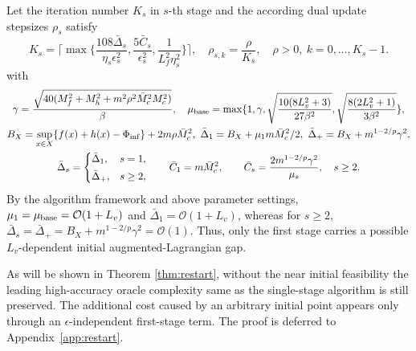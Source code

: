 \documentclass[11pt]{article}
\numberwithin{equation}{section}
\newcommand{\be}{\begin{equation}}
\newcommand{\ee}{\end{equation}}
\begin{document}
Let the iteration number $K_s$ in $s$-th stage and the according dual update stepsizes $\rho_s$ satisfy
\be\label{K-s}
K_s=\lceil\max\{\frac{108\bar\Delta_s}{\eta_s\epsilon_s^2},
\frac{5\bar C_s}{\epsilon_s^2},
\frac{1}{L_f^2\eta_s^2}\}\rceil,
\quad \rho_{s,k}=\frac{\rho}{K_s},\quad \rho>0,\ k=0,\ldots,K_s-1.
\ee
with
\be\label{par-set-s}
\begin{gathered}
\gamma=\frac{\sqrt{40(M_f^2+M_h^2+m^2\rho^2\bar{M}_c^2M_c^2)}}{\beta},\quad \mu_{\rm base}=\max\{1,\gamma,
\sqrt{\frac{10(8L_v^2+3)}{27\beta^2}},
\sqrt{\frac{8(2L_v^2+1)}{3\beta^2}}\},\\
B_X=\sup_{x\in X}\{f(x)+h(x)-\Phi_{\rm inf}\}+2m\rho \bar{M}_c^2,\ 
 \bar\Delta_1=B_X+\mu_1m\bar{M}_c^2/2, \ \bar\Delta_+=B_X+m^{1-2/p}\gamma^2,\\
\bar\Delta_s=
\begin{cases}
\bar\Delta_1, & s=1,\\[1mm]
\bar\Delta_+, & s\ge2,
\end{cases}
\qquad
\bar C_1=m\bar{M}_c^2,
\qquad
\bar C_s=\frac{2m^{1-2/p}\gamma^2}{\mu_s},\quad s\ge2.
\end{gathered} 
\ee
By the algorithm framework and  above parameter settings, 
\(\mu_1=\mu_{\rm base}=\mathcal O(1+L_v)\) and \(\bar\Delta_1=\mathcal O(1+L_v)\), whereas for \(s\ge2\), \(\bar\Delta_s=\bar\Delta_+=B_X+m^{1-2/p}\gamma^2=\mathcal O(1)\). Thus, only the first stage carries a possible \(L_v\)-dependent initial augmented-Lagrangian gap.




As will be shown in Theorem \ref{thm:restart}, without the near initial feasibility the leading {high-accuracy} oracle complexity same as the single-stage algorithm is still  preserved. The additional cost caused by an arbitrary initial point appears only through an \(\epsilon\)-independent first-stage term. The proof  is deferred to Appendix~\ref{app:restart}. 
\end{document}

